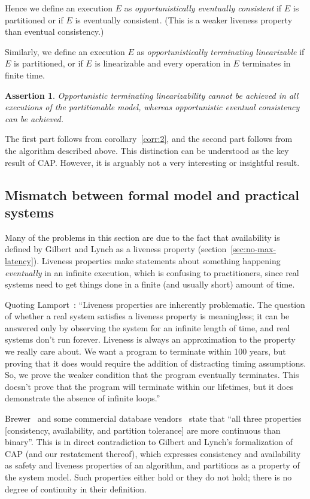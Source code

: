 \documentclass[a4paper,twocolumn,10pt]{article}
\newtheorem{theorem}{Assertion}
\begin{document}
Hence we define an execution $E$ as \emph{opportunistically eventually consistent} if $E$ is
partitioned or if $E$ is eventually consistent. (This is a weaker liveness property than eventual
consistency.)

Similarly, we define an execution $E$ as \emph{opportunistically terminating linearizable} if $E$ is
partitioned, or if $E$ is linearizable and every operation in $E$ terminates in finite time.

\begin{theorem}\label{th:4}
Opportunistic terminating linearizability cannot be achieved in all executions of the partitionable
model, whereas opportunistic eventual consistency \emph{can} be achieved.
\end{theorem}

The first part follows from corollary~\ref{corr:2}, and the second part follows from the algorithm
described above. This distinction can be understood as the key result of CAP. However, it is
arguably not a very interesting or insightful result.

\subsection{Mismatch between formal model and practical systems}

Many of the problems in this section are due to the fact that availability is defined by Gilbert and
Lynch as a liveness property (section~\ref{sec:no-max-latency}). Liveness properties make statements
about something happening \emph{eventually} in an infinite execution, which is confusing to
practitioners, since real systems need to get things done in a finite (and usually short) amount of
time.

Quoting Lamport~\cite{Lamport2000bi}: ``Liveness properties are inherently problematic. The question
of whether a real system satisfies a liveness property is meaningless; it can be answered only by
observing the system for an infinite length of time, and real systems don't run forever. Liveness is
always an approximation to the property we really care about. We want a program to terminate within
100 years, but proving that it does would require the addition of distracting timing assumptions.
So, we prove the weaker condition that the program eventually terminates. This doesn't prove that
the program will terminate within our lifetimes, but it does demonstrate the absence of infinite
loops.''

Brewer~\cite{Brewer2012ba} and some commercial database vendors~\cite{Aerospike2014wa} state that
``all three properties [consistency, availability, and partition tolerance] are more continuous than
binary''. This is in direct contradiction to Gilbert and Lynch's formalization of CAP (and our
restatement thereof), which expresses consistency and availability as safety and liveness properties
of an algorithm, and partitions as a property of the system model. Such properties either hold or
they do not hold; there is no degree of continuity in their definition.
\end{document}
